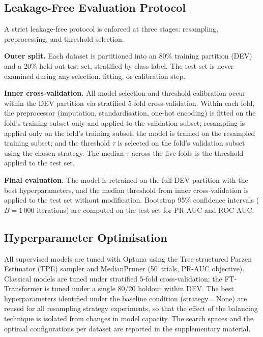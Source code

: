 \documentclass[a4paper,fleqn]{cas-sc}
\begin{document}
\subsection{Leakage-Free Evaluation Protocol}
\label{subsec:protocol}

A strict leakage-free protocol is enforced at three stages: resampling, preprocessing,
and threshold selection.

\textbf{Outer split.}
Each dataset is partitioned into an 80\% training partition (DEV) and a 20\% held-out
test set, stratified by class label. The test set is never examined during any
selection, fitting, or calibration step.

\textbf{Inner cross-validation.}
All model selection and threshold calibration occur within the DEV partition via
stratified 5-fold cross-validation. Within each fold, the preprocessor (imputation,
standardisation, one-hot encoding) is fitted on the fold's training subset only and
applied to the validation subset; resampling is applied only on the fold's training
subset; the model is trained on the resampled training subset; and the threshold
$\tau$ is selected on the fold's validation subset using the chosen strategy. The
median $\tau$ across the five folds is the threshold applied to the test set.

\textbf{Final evaluation.}
The model is retrained on the full DEV partition with the best hyperparameters, and
the median threshold from inner cross-validation is applied to the test set without
modification. Bootstrap 95\% confidence intervals ($B\!=\!1\,000$ iterations) are
computed on the test set for PR-AUC and ROC-AUC.

\subsection{Hyperparameter Optimisation}
\label{subsec:hpo}

All supervised models are tuned with Optuna \citep{akiba2019optuna} using the
Tree-structured Parzen Estimator (TPE) sampler and MedianPruner (50~trials, PR-AUC
objective). Classical models are tuned under stratified 5-fold cross-validation; the
FT-Transformer is tuned under a single 80/20 holdout within DEV. The best
hyperparameters identified under the baseline condition (strategy\,=\,None) are reused
for all resampling strategy experiments, so that the effect of the balancing technique
is isolated from changes in model capacity. The search spaces and the optimal
configurations per dataset are reported in the supplementary material.
\end{document}

